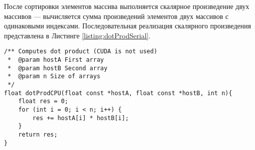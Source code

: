 После сортировки элементов массива выполняется скалярное произведение двух массивов --- вычисляется сумма произведений элементов двух массивов с одинаковыми индексами. Последовательная реализация скалярного произведения представлена в Листинге \ref{listing:dotProdSerial}.
\begin{lstlisting}[style=CStyle, label={listing:dotProdSerial}, caption={Последовательная версия скалярного произведения.}]
/** Computes dot product (CUDA is not used)
 *	@param hostA First array
 *	@param hostB Second array
 *	@param n Size of arrays
 */
float dotProdCPU(float const *hostA, float const *hostB, int n){
	float res = 0;
	for (int i = 0; i < n; i++) {
		res += hostA[i] * hostB[i];
	}
	return res;
}
\end{lstlisting}